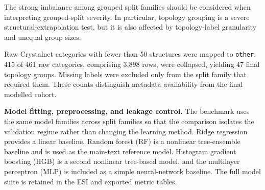 \documentclass[11pt,a4paper]{article}
\begin{document}
The strong imbalance among grouped split families should be considered when interpreting grouped-split severity. In particular, topology grouping is a severe structural-extrapolation test, but it is also affected by topology-label granularity and unequal group sizes.

\begin{table}[H]
\centering
\scriptsize
\caption{\textbf{Group construction, coverage, and original singleton filtering.} Labelled rows are counted before the submitted benchmark removed groups of size one separately within each grouped cohort. Size summaries apply to eligible groups after singleton removal.}
\label{tab:group_construction}
\end{table}

Raw Crystalnet categories with fewer than 50 structures were mapped to \texttt{other}: 415 of 461 raw categories, comprising 3,898 rows, were collapsed, yielding 47 final topology groups. Missing labels were excluded only from the split family that required them. These counts distinguish metadata availability from the final modelled cohort.





\noindent\textbf{Model fitting, preprocessing, and leakage control.}
The benchmark uses the same model families across split families so that the comparison isolates the validation regime rather than changing the learning method. Ridge regression provides a linear baseline. Random forest (RF) is a nonlinear tree-ensemble baseline and is used as the main-text reference model. Histogram gradient boosting (HGB) is a second nonlinear tree-based model, and the multilayer perceptron (MLP) is included as a simple neural-network baseline. The full model suite is retained in the ESI and exported metric tables.
\end{document}
